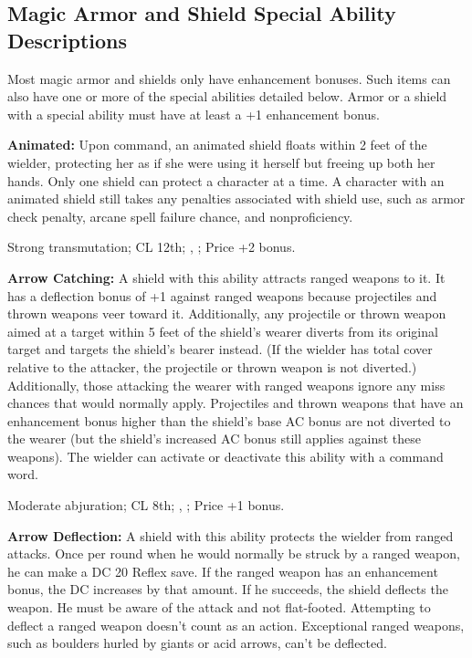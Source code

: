 \subsection{Magic Armor and Shield Special Ability Descriptions}
Most magic armor and shields only have enhancement bonuses. Such items can also have one or more of the special abilities detailed below. Armor or a shield with a special ability must have at least a +1 enhancement bonus.

\textbf{Animated:} Upon command, an animated shield floats within 2 feet of the wielder, protecting her as if she were using it herself but freeing up both her hands. Only one shield can protect a character at a time. A character with an animated shield still takes any penalties associated with shield use, such as armor check penalty, arcane spell failure chance, and nonproficiency.

Strong transmutation; CL 12th; , ; Price +2 bonus.

\textbf{Arrow Catching:} A shield with this ability attracts ranged weapons to it. It has a deflection bonus of +1 against ranged weapons because projectiles and thrown weapons veer toward it. Additionally, any projectile or thrown weapon aimed at a target within 5 feet of the shield's wearer diverts from its original target and targets the shield's bearer instead. (If the wielder has total cover relative to the attacker, the projectile or thrown weapon is not diverted.) Additionally, those attacking the wearer with ranged weapons ignore any miss chances that would normally apply. Projectiles and thrown weapons that have an enhancement bonus higher than the shield's base AC bonus are not diverted to the wearer (but the shield's increased AC bonus still applies against these weapons). The wielder can activate or deactivate this ability with a command word.

Moderate abjuration; CL 8th; , ; Price +1 bonus.

\textbf{Arrow Deflection:} A shield with this ability protects the wielder from ranged attacks. Once per round when he would normally be struck by a ranged weapon, he can make a DC 20 Reflex save. If the ranged weapon has an enhancement bonus, the DC increases by that amount. If he succeeds, the shield deflects the weapon. He must be aware of the attack and not flat-footed. Attempting to deflect a ranged weapon doesn't count as an action. Exceptional ranged weapons, such as boulders hurled by giants or acid arrows, can't be deflected.


